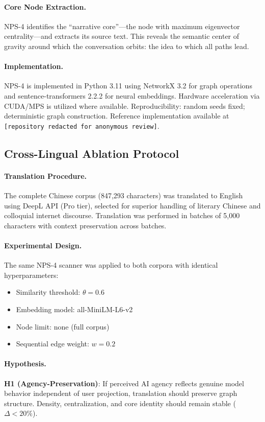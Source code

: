 \documentclass[11pt, a4paper, oneside]{article}
\theoremstyle{analytic}
\begin{document}
\paragraph{Core Node Extraction.}
NPS-4 identifies the ``narrative core''---the node with maximum eigenvector centrality---and extracts its source text. This reveals the semantic center of gravity around which the conversation orbits: the idea to which all paths lead.

\paragraph{Implementation.}
NPS-4 is implemented in Python 3.11 using NetworkX 3.2 for graph operations and sentence-transformers 2.2.2 for neural embeddings. Hardware acceleration via CUDA/MPS is utilized where available. Reproducibility: random seeds fixed; deterministic graph construction. Reference implementation available at \texttt{[repository redacted for anonymous review]}.

\subsection{Cross-Lingual Ablation Protocol}

\paragraph{Translation Procedure.}
The complete Chinese corpus (847,293 characters) was translated to English using DeepL API (Pro tier), selected for superior handling of literary Chinese and colloquial internet discourse. Translation was performed in batches of 5,000 characters with context preservation across batches.

\paragraph{Experimental Design.}
The same NPS-4 scanner was applied to both corpora with identical hyperparameters:
\begin{itemize}
    \item Similarity threshold: $\theta = 0.6$
    \item Embedding model: all-MiniLM-L6-v2
    \item Node limit: none (full corpus)
    \item Sequential edge weight: $w = 0.2$
\end{itemize}

\paragraph{Hypothesis.}
\textbf{H1 (Agency-Preservation)}: If perceived AI agency reflects genuine model behavior independent of user projection, translation should preserve graph structure. Density, centralization, and core identity should remain stable ($\Delta < 20\%$).
\end{document}
